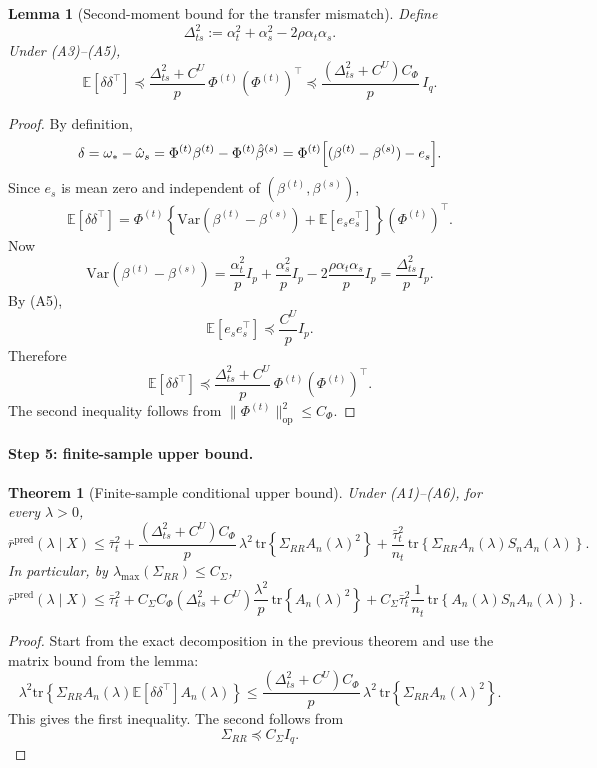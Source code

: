 \documentclass[11pt]{article}
\newcommand{\1}{\mathbf{1}}
\newtheorem{theorem}{Theorem}
\newtheorem{lemma}{Lemma}
\begin{document}
\begin{lemma}[Second-moment bound for the transfer mismatch]
Define
\[
\Delta_{ts}^2:=\alpha_t^2+\alpha_s^2-2\rho\alpha_t\alpha_s.
\]
Under (A3)--(A5),
\[
\mathbb E[\delta\delta^\top]
\preceq
\frac{\Delta_{ts}^2+C^U}{p}\,
\Phi^{(t)}(\Phi^{(t)})^\top
\preceq
\frac{(\Delta_{ts}^2+C^U)C_\Phi}{p}\,I_q.
\]
\end{lemma}

\begin{proof}
By definition,
\[
\delta
=
\omega_*-\hat\omega_s
=
\Phi^{(t)}\beta^{(t)}-\Phi^{(t)}\hat\beta^{(s)}
=
\Phi^{(t)}\Bigl[(\beta^{(t)}-\beta^{(s)})-e_s\Bigr].
\]
Since \(e_s\) is mean zero and independent of \((\beta^{(t)},\beta^{(s)})\),
\[
\mathbb E[\delta\delta^\top]
=
\Phi^{(t)}
\left\{
\mathrm{Var}(\beta^{(t)}-\beta^{(s)})+\mathbb E[e_s e_s^\top]
\right\}
(\Phi^{(t)})^\top.
\]
Now
\[
\mathrm{Var}(\beta^{(t)}-\beta^{(s)})
=
\frac{\alpha_t^2}{p}I_p+\frac{\alpha_s^2}{p}I_p
-
2\frac{\rho\alpha_t\alpha_s}{p}I_p
=
\frac{\Delta_{ts}^2}{p}I_p.
\]
By (A5),
\[
\mathbb E[e_s e_s^\top]\preceq \frac{C^U}{p}I_p.
\]
Therefore
\[
\mathbb E[\delta\delta^\top]
\preceq
\frac{\Delta_{ts}^2+C^U}{p}\,
\Phi^{(t)}(\Phi^{(t)})^\top.
\]
The second inequality follows from \(\|\Phi^{(t)}\|_{\mathrm{op}}^2\le C_\Phi\).
\end{proof}

\bigskip

\paragraph{Step 5: finite-sample upper bound.}

\begin{theorem}[Finite-sample conditional upper bound]
Under (A1)--(A6), for every \(\lambda>0\),
\[
\bar r^{\mathrm{pred}}(\lambda\mid X)
\le
\bar\tau_t^2
+
\frac{(\Delta_{ts}^2+C^U)C_\Phi}{p}\,
\lambda^2\,
\mathrm{tr}\!\left\{\Sigma_{RR}A_n(\lambda)^2\right\}
+
\frac{\bar\tau_t^2}{n_t}\,
\mathrm{tr}\!\left\{\Sigma_{RR}A_n(\lambda)S_nA_n(\lambda)\right\}.
\]
In particular, by \(\lambda_{\max}(\Sigma_{RR})\le C_\Sigma\),
\[
\bar r^{\mathrm{pred}}(\lambda\mid X)
\le
\bar\tau_t^2
+
C_\Sigma C_\Phi(\Delta_{ts}^2+C^U)\frac{\lambda^2}{p}\,
\mathrm{tr}\!\left\{A_n(\lambda)^2\right\}
+
C_\Sigma\bar\tau_t^2\frac1{n_t}\,
\mathrm{tr}\!\left\{A_n(\lambda)S_nA_n(\lambda)\right\}.
\]
\end{theorem}

\begin{proof}
Start from the exact decomposition in the previous theorem and use the matrix bound from the lemma:
\[
\lambda^2\mathrm{tr}\!\left\{
\Sigma_{RR}A_n(\lambda)\mathbb E[\delta\delta^\top]A_n(\lambda)
\right\}
\le
\frac{(\Delta_{ts}^2+C^U)C_\Phi}{p}\,
\lambda^2\,
\mathrm{tr}\!\left\{\Sigma_{RR}A_n(\lambda)^2\right\}.
\]
This gives the first inequality. The second follows from
\[
\Sigma_{RR}\preceq C_\Sigma I_q.
\]
\end{proof}
\end{document}
